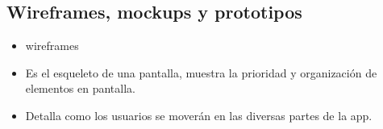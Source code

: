 \documentclass{article}
\begin{document}
\subsection{Wireframes, mockups y prototipos}
\begin{itemize}
    \item wireframes
    \item Es el esqueleto de una pantalla, muestra la prioridad y organización de elementos en pantalla.
    \item Detalla como los usuarios se moverán en las diversas partes de la app.
\end{itemize}
\end{document}
